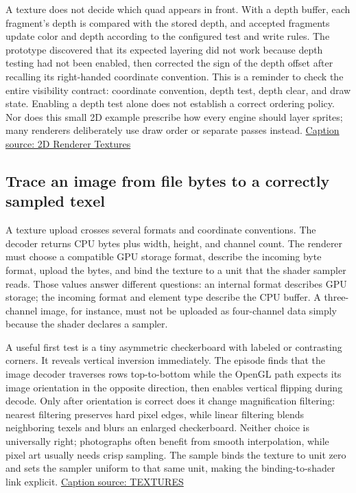 A texture does not decide which quad appears in front. With a depth buffer, each fragment's depth is compared with the stored depth, and accepted fragments update color and depth according to the configured test and write rules. The prototype discovered that its expected layering did not work because depth testing had not been enabled, then corrected the sign of the depth offset after recalling its right-handed coordinate convention. This is a reminder to check the entire visibility contract: coordinate convention, depth test, depth clear, and draw state. Enabling a depth test alone does not establish a correct ordering policy. Nor does this small 2D example prescribe how every engine should layer sprites; many renderers deliberately use draw order or separate passes instead. \href{https://www.youtube.com/watch?v=mW8eW3pLtmk}{Caption source: 2D Renderer Textures}

\subsection{Trace an image from file bytes to a correctly sampled texel}\label{06-engine-ii-ch027-trace-an-image-from-file-bytes-to-a-correctly-sampled-texel}

A texture upload crosses several formats and coordinate conventions. The decoder returns CPU bytes plus width, height, and channel count. The renderer must choose a compatible GPU storage format, describe the incoming byte format, upload the bytes, and bind the texture to a unit that the shader sampler reads. Those values answer different questions: an internal format describes GPU storage; the incoming format and element type describe the CPU buffer. A three-channel image, for instance, must not be uploaded as four-channel data simply because the shader declares a sampler.

A useful first test is a tiny asymmetric checkerboard with labeled or contrasting corners. It reveals vertical inversion immediately. The episode finds that the image decoder traverses rows top-to-bottom while the OpenGL path expects its image orientation in the opposite direction, then enables vertical flipping during decode. Only after orientation is correct does it change magnification filtering: nearest filtering preserves hard pixel edges, while linear filtering blends neighboring texels and blurs an enlarged checkerboard. Neither choice is universally right; photographs often benefit from smooth interpolation, while pixel art usually needs crisp sampling. The sample binds the texture to unit zero and sets the sampler uniform to that same unit, making the binding-to-shader link explicit. \href{https://www.youtube.com/watch?v=qEfohFgQ1-I}{Caption source: TEXTURES}

